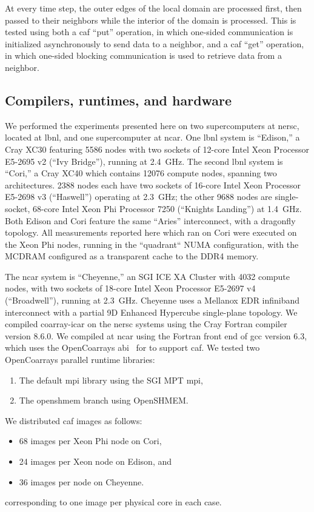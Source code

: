At every time step, the outer edges of the local domain are processed first,
then passed to their neighbors while the interior of the domain is processed.
This is tested using both a \gls{caf} ``put'' operation, in which one-sided communication is initialized asynchronously to send data to a neighbor,
and a \gls{caf} ``get'' operation, in which one-sided blocking communication is used to retrieve data from a neighbor.

\subsection{Compilers, runtimes, and hardware}

We performed the experiments presented here on two supercomputers at \gls{nersc},
located at \gls{lbnl}, and one supercomputer at \gls{ncar}.
One \gls{lbnl} system is ``Edison,'' a Cray XC30 featuring 5586 nodes with two sockets of 12-core Intel Xeon Processor E5-2695 v2 (``Ivy Bridge''), running at \num{2.4}~\si{\giga\hertz}.
The second \gls{lbnl} system is ``Cori,'' a Cray XC40 which contains \num{12076} compute nodes, spanning two architectures. \num{2388} nodes each have two sockets of 16-core Intel Xeon Processor E5-2698 v3 (``Haswell'') operating at \num{2.3}~\si{\giga\hertz}; the other \num{9688} nodes are single-socket, 68-core Intel Xeon Phi Processor 7250 (``Knights Landing'') at \num{1.4}~\si{\giga\hertz}.
Both Edison and Cori feature the same ``Aries'' interconnect, with a dragonfly topology.
All measurements reported here which ran on Cori were executed on the Xeon Phi nodes, running in the ``quadrant`` NUMA configuration, with the MCDRAM configured as a transparent cache to the DDR4 memory.

The \gls{ncar} system is ``Cheyenne,'' an SGI ICE XA Cluster with \num{4032} compute nodes, with two sockets of 18-core Intel Xeon Processor E5-2697 v4 (``Broadwell''), running at \num{2.3}~\si{\giga\hertz}.
Cheyenne uses a Mellanox EDR infiniband interconnect with a partial 9D Enhanced Hypercube single-plane topology.
We compiled coarray-\gls{icar} on the \gls{nersc} systems using the Cray Fortran compiler version 8.6.0.  We compiled
at \gls{ncar} using the Fortran front end of \gls{gcc} version 6.3, which uses the
OpenCoarrays \gls{abi}~\cite{fanfarillo2014opencoarrays} for to support \gls{caf}.  We tested two OpenCoarrays parallel runtime libraries:
\begin{enumerate}
  \item The default \gls{mpi} library using the SGI MPT \gls{mpi},
  \item The openshmem branch using OpenSHMEM.
\end{enumerate}
We distributed \gls{caf} images as follows:
\begin{itemize}
  \item 68 images per Xeon Phi node on Cori,
  \item 24 images per Xeon node on Edison, and
  \item 36 images per node on Cheyenne.
\end{itemize}
corresponding to one image per physical core in each case.

